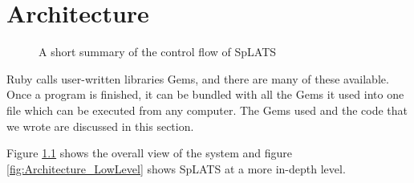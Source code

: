 \chapter{Architecture}

\begin{center}
\begin{figure}
\caption{A short summary of the control flow of SpLATS}
\label{fig:Architecture_HighLevel}
\end{figure}
\end{center}

  Ruby calls user-written libraries Gems, and there are many of these available. Once a program is finished, it can be bundled with all the Gems it used into one file which can be executed from any computer. The Gems used and the code that we wrote are discussed in this section.
  
  Figure \ref{fig:Architecture_HighLevel} shows the overall view of the system and figure \ref{fig:Architecture_LowLevel} shows SpLATS at a more in-depth level.

